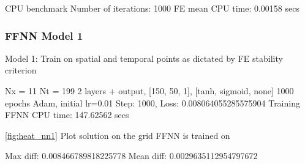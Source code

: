 CPU benchmark
Number of iterations: 1000
FE mean CPU time: 0.00158 secs

\subsubsection{FFNN Model 1}

Model 1: Train on spatial and temporal points as dictated by FE stability criterion

Nx = 11
Nt = 199
2 layers + output, [150, 50, 1], [tanh, sigmoid, none] 
1000 epochs
Adam, initial lr=0.01
Step: 1000, Loss: 0.008064055285575904
Training FFNN CPU time: 147.62562 secs

\autoref{fig:heat_nn1} Plot solution on the grid FFNN is trained on

Max diff: 0.008466789818225778
Mean diff: 0.0029635112954797672

